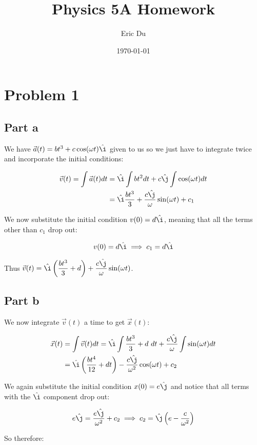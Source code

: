 \documentclass{article}
\title{Physics 5A Homework}
\author{Eric Du}
\date{\today}
\theoremstyle{definition}
\numberwithin{equation}{section}
\numberwithin{definition}{section}
\begin{document}
	\maketitle
	\tableofcontents
	\section{Problem 1}
	\subsection{Part a}
	We have $\vec{a}(t) = bt^3 + c \cos(\omega t)\hat \i$ given to us so we just have to integrate twice and incorporate the initial conditions:
	
	\begin{align*}
		\vec v(t) = \int \vec a(t) dt &= \hat \i \int bt^2 dt + c\hat \j \int \cos(\omega t) dt \\
		&= \hat \i \frac{bt^3}{3} + \frac{c\hat \j}{\omega} \sin(\omega t) + c_1
		\end{align*}
	
	We now substitute the initial condition $v(0) = d \hat \i$, meaning that all the terms other than $c_1$ drop out:
	
	\[ v(0) = d\hat \i \implies c_1 = d\hat \i \]
	
	Thus $\vec v(t) = \hat \i \left(\dfrac{bt^3}{3}+d\right) + \dfrac{c\hat \j}{\omega}\sin (\omega t)$. 
	
	
	\subsection{Part b}
	
	We now integrate $\vec v(t)$ a time to get $\vec x(t)$:
	
	\begin{align*}
		\vec x(t) &= \int \vec v(t) dt = \hat \i \int \frac{bt^3}{3} + d \ dt + \frac{c\hat \j}{\omega}\int\sin(\omega t) dt\\
		&= \hat \i\left(\frac{bt^4}{12} + dt\right) - \frac{c \hat \j}{\omega^2} \cos(\omega t) + c_2\\
		\end{align*}
	
	We again substitute the initial condition $x(0) = e\hat \j$ and notice that all terms with the $\hat \i$ component drop out:
	
	\[ e \hat \j = \frac{e\hat \j}{\omega^2} + c_2 \implies c_2 = \hat \j \left(e - \frac{c}{\omega^2}\right)\]
	
	So therefore: 
	
\end{document}
